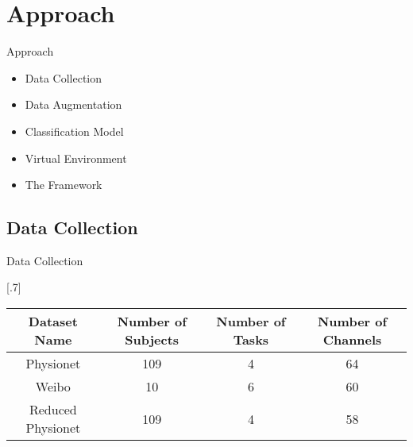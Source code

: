 \section{Approach}
\begin{frame}{Approach}
    \begin{itemize}
        \item Data Collection
        \item Data Augmentation
        \item Classification Model
        \item Virtual Environment
        \item The Framework
    \end{itemize}
\end{frame}

\subsection*{Data Collection}
\begin{frame}{Data Collection}
    \begin{table}[!htbp] 
        \centering 
        \scalebox{.7}[.7]{
            \begin{tabular}{|c|c|c|c|} 
                \hline 
                \textbf{Dataset Name} & \textbf{Number of
    Subjects} & \textbf{Number of Tasks} & \textbf{Number of Channels}\\
                \hline
                \hline 
                Physionet & 109 & 4 & 64\\ 
                \hline 
                Weibo & 10 & 6 & 60\\ 
                \hline 
                \hline
                Reduced Physionet & 109 & 4 & 58\\
                \hline 
            \end{tabular} 
        }
    \end{table}
\end{frame}

